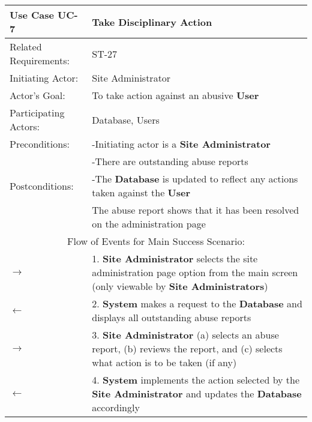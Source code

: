 \begin{centering}
\renewcommand\arraystretch{1.3} %
\label{UC-7}
\begin{longtable}{|p{1.2in} p{5in}|}
\hline
\bfseries{\color{color1}Use Case UC-7} & \bfseries{\color{color1}Take Disciplinary Action} \\
\hline
Related Requirements: & ST-27 \\ 
Initiating Actor:     & Site Administrator \\
Actor's Goal:         & To take action against an abusive \textbf{User} \\
Participating Actors:  & Database, Users \\
Preconditions:        & -Initiating actor is a \textbf{Site Administrator} \\
 & -There are outstanding abuse reports \\
Postconditions:       & -The \textbf{Database} is updated to reflect any actions taken against the \textbf{User} \\
 & The abuse report shows that it has been resolved on the administration page\\
\hline
\multicolumn{2}{|c|}{\color{color1}Flow of Events for Main Success Scenario:}\\
\hline
$\rightarrow$ & 1. \textbf{Site Administrator} selects the site administration page option from the main screen (only viewable by \textbf{Site Administrators}) \\
$\leftarrow$ & 2. \textbf{System} makes a request to the \textbf{Database} and displays all outstanding abuse reports\\
$\rightarrow$ & 3. \textbf{Site Administrator} (a) selects an abuse report, (b) reviews the report, and (c) selects what action is to be taken (if any)\\
$\leftarrow$ & 4. \textbf{System} implements the action selected by the \textbf{Site Administrator} and updates the \textbf{Database} accordingly \\
\hline
\end{longtable}
\end{centering}
